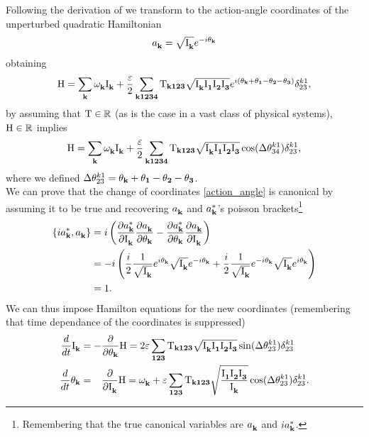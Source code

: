 Following the derivation of \cite{Onorato2020} we transform to the action-angle coordinates of the unperturbed quadratic Hamiltonian
\begin{equation}
    a_\mathbf{k}^{} = \sqrt{\mathrm{I}^{}_\mathbf{k}}e^{-i\theta_\mathbf{k}}
    \label{action_angle}
\end{equation} 
obtaining 
\begin{equation}
    \mathrm{H} = \sum_\mathbf{k} \omega^{}_{\mathbf{k}} \mathrm{I}^{}_\mathbf{k} + \frac{\varepsilon}{2} 
    \sum_{\mathbf{k1234}}\mathrm{T}_{\mathbf{k123}}\sqrt{\mathrm{I}^{}_\mathbf{k}\mathrm{I}^{}_\mathbf{1}\mathrm{I}^{}_\mathbf{2}\mathrm{I}^{}_\mathbf{3}}
    e^{i(\theta_\mathbf{k} + \theta_\mathbf{1} - \theta_\mathbf{2} - \theta_\mathbf{3})}\delta^{k1}_{23},
\end{equation}
by assuming that $\mathrm{T} \in \mathbb{R}$ (as is the case in a vast class of physical systems), $\mathrm{H} \in \mathbb{R}$ implies 
\begin{equation}
    \mathrm{H} = \sum_\mathbf{k} \omega^{}_{\mathbf{k}} \mathrm{I}^{}_\mathbf{k} + \frac{\varepsilon}{2} \sum_{\mathbf{k1234}}\mathrm{T}_{\mathbf{k123}}\sqrt{\mathrm{I}^{}_\mathbf{k}\mathrm{I}^{}_\mathbf{1}\mathrm{I}^{}_\mathbf{2}\mathrm{I}^{}_\mathbf{3}}\cos(\Delta\theta^{k1}_{34})\delta^{k1}_{23},
\end{equation}
where we defined $\Delta\theta^{k1}_{23}=\theta_\mathbf{k} + \theta_\mathbf{1} - \theta_\mathbf{2} - \theta_\mathbf{3}$. \\
We can prove that the change of coordinates \eqref{action_angle} is canonical by assuming it to be true and recovering $a_\mathbf{k}^{}$ and $a_\mathbf{k}^{*}$'s poisson 
brackets\footnote{Remembering that the true canonical variables are $a_\mathbf{k}^{}$ and $ia_\mathbf{k}^{*}$.} 
\begin{align}
    \left\{ ia_\mathbf{k}^{*}, a_\mathbf{k}^{} \right\} &= i \left( \frac{\partial a_\mathbf{k}^{*}}{\partial \mathrm{I}^{}_\mathbf{k}}\frac{\partial a_\mathbf{k}^{}}{\partial \theta_\mathbf{k}}  -
    \frac{\partial a_\mathbf{k}^{*}}{\partial \theta_\mathbf{k}}\frac{\partial a_\mathbf{k}^{}}{\partial \mathrm{I}^{}_\mathbf{k}}  \right) \\
    &= - i \left( \frac{i}{2} \frac{1}{\sqrt{\mathrm{I}^{}_\mathbf{k}}}e^{i\theta_\mathbf{k}}\sqrt{\mathrm{I}^{}_\mathbf{k}}e^{-i\theta_\mathbf{k}} + 
    \frac{i}{2} \frac{1}{\sqrt{\mathrm{I}^{}_\mathbf{k}}}e^{-i\theta_\mathbf{k}}\sqrt{\mathrm{I}^{}_\mathbf{k}}e^{i\theta_\mathbf{k}}\right) \\
    &= 1 .
\end{align} 
We can thus impose Hamilton equations for the new coordinates (remembering that time dependance of the coordinates is suppressed)
\begin{align}
    \frac{d}{dt}\mathrm{I}^{}_\mathbf{k} &= - \frac{\partial }{\partial \theta_\mathbf{k}}\mathrm{H} = 2 \varepsilon \sum_{\mathbf{123}} \mathrm{T}_{\mathbf{k123}} \sqrt{\mathrm{I}^{}_\mathbf{k}\mathrm{I}^{}_\mathbf{1}\mathrm{I}^{}_\mathbf{2}\mathrm{I}^{}_\mathbf{3}} \sin(\Delta\theta^{k1}_{23})\delta^{k1}_{23}
    \label{Hameq1}\\
    \frac{d}{dt}\theta_\mathbf{k} &= \phantom{-} \frac{\partial }{\partial \mathrm{I}^{}_\mathbf{k}}\mathrm{H} = \omega^{}_{\mathbf{k}} + 
    \varepsilon \sum_{\mathbf{123}} \mathrm{T}_{\mathbf{k123}} \sqrt{\frac{\mathrm{I}^{}_\mathbf{1}\mathrm{I}^{}_\mathbf{2}\mathrm{I}^{}_\mathbf{3}}{\mathrm{I}^{}_\mathbf{k}}}\cos(\Delta\theta^{k1}_{23})\delta^{k1}_{23}.
    \label{Hameq2}
\end{align}
